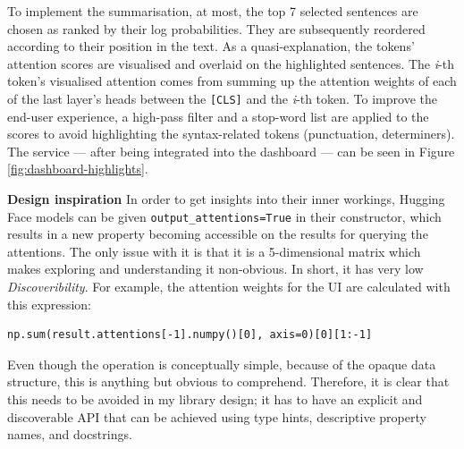 To implement the summarisation, at most, the top 7 selected sentences are chosen as ranked by their log probabilities. They are subsequently reordered according to their position in the text. As a quasi-explanation, the tokens' attention scores are visualised and overlaid on the highlighted sentences. The \textit{i}-th token's visualised attention comes from summing up the attention weights of each of the last layer's heads between the \texttt{[CLS]} and the \textit{i}-th token. To improve the end-user experience, a high-pass filter and a stop-word list are applied to the scores to avoid highlighting the syntax-related tokens (punctuation, determiners). The service --- after being integrated into the dashboard --- can be seen in Figure \ref{fig:dashboard-highlights}.

\begin{displayquote}
\textbf{Design inspiration} In order to get insights into their inner workings, Hugging Face models can be given \texttt{output\_attentions=True} in their constructor, which results in a new property becoming accessible on the results for querying the attentions. The only issue with it is that it is a 5-dimensional matrix which makes exploring and understanding it non-obvious. In short, it has very low \textit{Discoveribility}. For example, the attention weights for the UI are calculated with this expression:
\begin{verbatim}
np.sum(result.attentions[-1].numpy()[0], axis=0)[0][1:-1]
\end{verbatim}
Even though the operation is conceptually simple, because of the opaque data structure, this is anything but obvious to comprehend. Therefore, it is clear that this needs to be avoided in my library design; it has to have an explicit and discoverable API that can be achieved using type hints, descriptive property names, and docstrings.
\end{displayquote}

